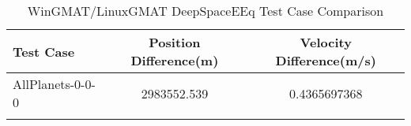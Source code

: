 \begin{table}[htbp!]
\centering
\caption{ WinGMAT/LinuxGMAT DeepSpaceEEq Test Case Comparison}
      \begin{tabular}{lcc}
      \hline\hline
          Test Case & Position Difference(m) & Velocity Difference(m/s) \\
         \hline
         AllPlanets-0-0-0 & 2983552.539 & 0.4365697368 \\
      \hline\hline
      \label{Table: DeepSpaceEEq WinGMAT-LinuxGMAT Table} 
\end{tabular}
\end{table}
